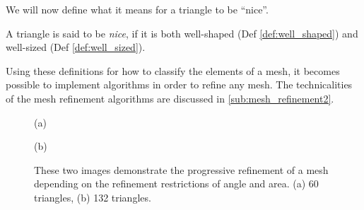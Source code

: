 \documentclass[../fem.tex]{subfile}
\begin{document}
We will now define what it means for a triangle to be ``nice''.

\begin{definition}[nice] \label{def:nice_tri}
  A triangle is said to be \textit{nice}, if it is both well-shaped (Def
  \ref{def:well_shaped}) and well-sized (Def \ref{def:well_sized}).
\end{definition}

Using these definitions for how to classify the elements of a mesh, it becomes
possible to implement algorithms in order to refine any mesh. The
technicalities of the mesh refinement algorithms are discussed in
\ref{sub:mesh_refinement2}.

\begin{figure}[htpb]
  \centering
     \begin{minipage}{0.4\textwidth}
     \begin{center}
       
       (a)
     \end{center}
   \end{minipage}
   \begin{minipage}{0.4\textwidth}
     \begin{center}
       
       (b)
     \end{center}
   \end{minipage}
  \caption{These two images demonstrate the progressive refinement of a mesh
  depending on the refinement restrictions of angle and area. (a) 60 triangles,
(b) 132 triangles.}
  \label{fig:name}
\end{figure}
\end{document}
